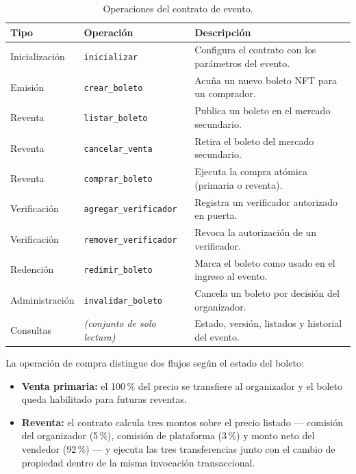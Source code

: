 \begin{table}[H]
\centering
\small
\renewcommand{\arraystretch}{1.3}
\caption{Operaciones del contrato de evento.}
\label{tab:funciones-evento}
\begin{tabularx}{\textwidth}{>{\raggedright\arraybackslash}p{2.2cm} >{\raggedright\arraybackslash}p{4.2cm}
>{\raggedright\arraybackslash}X}
\toprule
\rowcolor{rowgray}
\textbf{Tipo} & \textbf{Operación} & \textbf{Descripción} \\
\midrule
Inicialización & \texttt{inicializar} & Configura el contrato con los parámetros del evento. \\
\rowcolor{rowgray}
Emisión & \texttt{crear\_boleto} & Acuña un nuevo boleto NFT para un comprador. \\
Reventa & \texttt{listar\_boleto} & Publica un boleto en el mercado secundario. \\
\rowcolor{rowgray}
Reventa & \texttt{cancelar\_venta} & Retira el boleto del mercado secundario. \\
Reventa & \texttt{comprar\_boleto} & Ejecuta la compra atómica (primaria o reventa). \\
\rowcolor{rowgray}
Verificación & \texttt{agregar\_verificador} & Registra un verificador autorizado en puerta. \\
Verificación & \texttt{remover\_verificador} & Revoca la autorización de un verificador. \\
\rowcolor{rowgray}
Redención & \texttt{redimir\_boleto} & Marca el boleto como usado en el ingreso al evento. \\
Administración & \texttt{invalidar\_boleto} & Cancela un boleto por decisión del organizador. \\
\rowcolor{rowgray}
Consultas & \textit{(conjunto de solo lectura)} & Estado, versión, listados y historial del evento. \\
\bottomrule
\end{tabularx}
\end{table}

La operación de compra distingue dos flujos según el estado del boleto:

\begin{itemize}\setlength{\itemsep}{2pt}
    \item \textbf{Venta primaria:} el 100\,\% del precio se transfiere al organizador y el boleto queda habilitado para futuras reventas.
    \item \textbf{Reventa:} el contrato calcula tres montos sobre el precio listado --- comisión del organizador (5\,\%), comisión de plataforma (3\,\%) y monto neto del vendedor (92\,\%) --- y ejecuta las tres transferencias junto con el cambio de propiedad dentro de la misma invocación transaccional.
\end{itemize}

